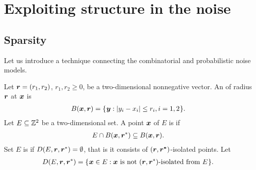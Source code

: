 \documentclass[12pt]{memoir}
\renewcommand{\le}{\leq}
\renewcommand{\ge}{\geq}
\newcommand{\Z}{Z}
\begin{document}


\section{Exploiting structure in the noise}\label{sec:noise}

\subsection{Sparsity}\label{sec:sparsity}
Let us introduce a technique connecting the combinatorial and probabilistic
noise models.

\begin{definition}
Let \( \boldsymbol{r}=(r_1,r_2) \), \( r_1, r_2\ge 0 \),
be a two-dimensional nonnegative vector.
An  of radius \( \boldsymbol{r} \)  at \( \boldsymbol{x} \) is
\begin{align}\label{eq:ball1}
  B(\vek{x},\vek{r}) = \setOf{\vek{y}}{\abs{y_i - x_i} \le r_i, i=1,2}.
\end{align}  
Let \( E\subseteq \mathbb{Z}^{2} \) be a two-dimensional set.
A point \( \boldsymbol{x} \) of \( E \) is  if
\begin{align*}
  E \cap B(\boldsymbol{x},\boldsymbol{r}^*)\subseteq B(\boldsymbol{x}, \boldsymbol{r}).
 \end{align*}
Set \( E \) is  
if \( D(E, \boldsymbol{r}, \boldsymbol{r}^*)=\emptyset \), that is 
it consists of \( (\boldsymbol{r}, \boldsymbol{r^*}) \)-isolated points.
Let
\begin{align}
  D(E,\boldsymbol{r}, \boldsymbol{r}^*) =
     \mathopen\{\mskip 1mu\boldsymbol{x}\in E : \boldsymbol{x} \text{\rmfamily\mdseries\upshape{ is not }} (\boldsymbol{r}, \boldsymbol{r}^*)\text{\rmfamily\mdseries\upshape{-isolated
  from }} E\mskip 1mu\mathclose\}.
\end{align}
\end{definition}
\end{document}
